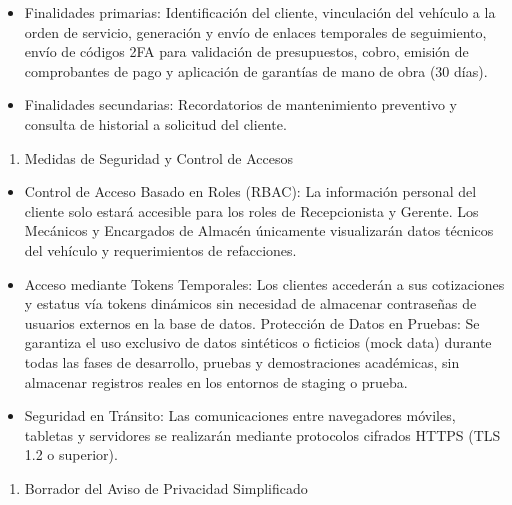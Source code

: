 \begin{itemize}
\item
  Finalidades primarias: Identificación del cliente, vinculación del
  vehículo a la orden de servicio, generación y envío de enlaces
  temporales de seguimiento, envío de códigos 2FA para validación de
  presupuestos, cobro, emisión de comprobantes de pago y aplicación de
  garantías de mano de obra (30 días).
\item
  Finalidades secundarias: Recordatorios de mantenimiento preventivo y
  consulta de historial a solicitud del cliente.
\end{itemize}

\begin{enumerate}
\def\labelenumi{\arabic{enumi}.}
\setcounter{enumi}{2}
\item
  Medidas de Seguridad y Control de Accesos
\end{enumerate}

\begin{itemize}
\item
  Control de Acceso Basado en Roles (RBAC): La información personal del
  cliente solo estará accesible para los roles de Recepcionista y
  Gerente. Los Mecánicos y Encargados de Almacén únicamente visualizarán
  datos técnicos del vehículo y requerimientos de refacciones.
\item
  Acceso mediante Tokens Temporales: Los clientes accederán a sus
  cotizaciones y estatus vía tokens dinámicos sin necesidad de almacenar
  contraseñas de usuarios externos en la base de datos. Protección de
  Datos en Pruebas: Se garantiza el uso exclusivo de datos sintéticos o
  ficticios (mock data) durante todas las fases de desarrollo, pruebas y
  demostraciones académicas, sin almacenar registros reales en los
  entornos de staging o prueba.
\item
  Seguridad en Tránsito: Las comunicaciones entre navegadores móviles,
  tabletas y servidores se realizarán mediante protocolos cifrados HTTPS
  (TLS 1.2 o superior).
\end{itemize}

\begin{enumerate}
\def\labelenumi{\arabic{enumi}.}
\setcounter{enumi}{3}
\item
  Borrador del Aviso de Privacidad Simplificado
\end{enumerate}

